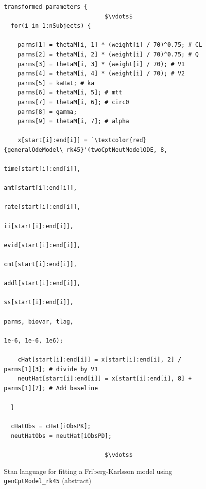 \documentclass[11pt]{amsart}
\newenvironment{fmpage}[1]
     {\begin{lrbox}{\fmbox}\begin{minipage}{#1}}
     {\end{minipage}\end{lrbox}\fbox{\usebox{\fmbox}}}
\begin{document}
\begin{figure}
\caption{Stan language for fitting a Friberg-Karlsson model using \texttt{genCptModel\_rk45} (abstract)}
\begin{tiny}
\begin{center}
\begin{fmpage}{\textwidth - .75in}
\begin{lstlisting}[basicstyle=\tiny\ttfamily,mathescape=true,flexiblecolumns=true,frame=single,escapeinside=`']
transformed parameters {
                             $\vdots$
  for(i in 1:nSubjects) {

    parms[1] = thetaM[i, 1] * (weight[i] / 70)^0.75; # CL
    parms[2] = thetaM[i, 2] * (weight[i] / 70)^0.75; # Q
    parms[3] = thetaM[i, 3] * (weight[i] / 70); # V1
    parms[4] = thetaM[i, 4] * (weight[i] / 70); # V2
    parms[5] = kaHat; # ka
    parms[6] = thetaM[i, 5]; # mtt
    parms[7] = thetaM[i, 6]; # circ0
    parms[8] = gamma;
    parms[9] = thetaM[i, 7]; # alpha

    x[start[i]:end[i]] = `\textcolor{red}{generalOdeModel\_rk45}'(twoCptNeutModelODE, 8,
                                                           time[start[i]:end[i]], 
                                                           amt[start[i]:end[i]], 
                                                           rate[start[i]:end[i]], 
                                                           ii[start[i]:end[i]], 
                                                           evid[start[i]:end[i]], 
                                                           cmt[start[i]:end[i]], 
                                                           addl[start[i]:end[i]], 
                                                           ss[start[i]:end[i]],
                                                           parms, biovar, tlag,
                                                           1e-6, 1e-6, 1e6);

    cHat[start[i]:end[i]] = x[start[i]:end[i], 2] / parms[1][3]; # divide by V1
    neutHat[start[i]:end[i]] = x[start[i]:end[i], 8] + parms[1][7]; # Add baseline
    
  }
  
  cHatObs = cHat[iObsPK];
  neutHatObs = neutHat[iObsPD];

                             $\vdots$  
\end{lstlisting}
\end{fmpage}
\end{center}
\end{tiny} 
\label{FKCode}
\end{figure}
\end{document}
